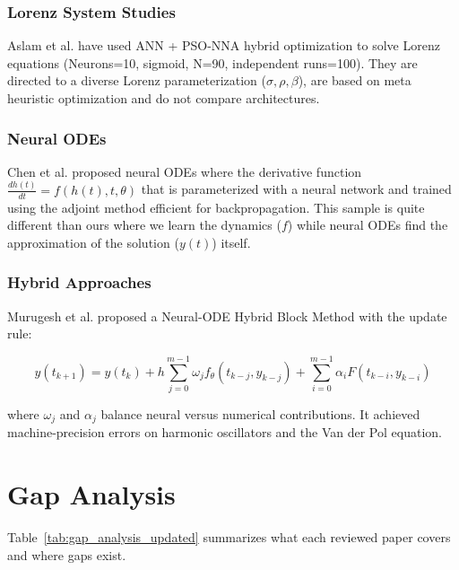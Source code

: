\subsubsection{Lorenz System Studies}

Aslam et al. \cite{aslam2024neuro} have used ANN + PSO-NNA hybrid optimization to solve Lorenz equations (Neurons=10, sigmoid, N=90, independent runs=100). They are directed to a diverse Lorenz parameterization ($\sigma, \rho, \beta$), are based on meta heuristic optimization and do not compare architectures.

\subsubsection{Neural ODEs}

Chen et al. \cite{chen2018neural} proposed neural ODEs where the derivative function $\frac{dh(t)}{dt} = f(h(t), t, \theta)$ that is parameterized with a neural network and trained using the adjoint method efficient for backpropagation. This sample is quite different than ours where we learn the dynamics ($f$) while neural ODEs find the approximation of the solution ($y(t)$) itself.

\subsubsection{Hybrid Approaches}

Murugesh et al. \cite{murugesh2025novel} proposed a Neural-ODE Hybrid Block Method with the update rule:

\begin{equation}
y(t_{k+1}) = y(t_k) + h \sum_{j=0}^{m-1} \omega_j f_\theta(t_{k-j}, y_{k-j}) + \sum_{i=0}^{m-1} \alpha_i F(t_{k-i}, y_{k-i})
\end{equation}

where $\omega_j$ and $\alpha_j$ balance neural versus numerical contributions. It achieved machine-precision errors on harmonic oscillators and the Van der Pol equation.

\clearpage %

\section{Gap Analysis}

Table~\ref{tab:gap_analysis_updated} summarizes what each reviewed paper covers and where gaps exist.

